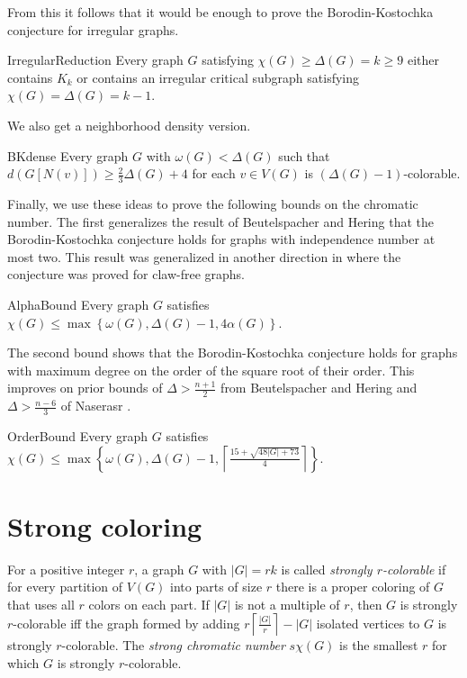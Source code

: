 \documentclass[12pt]{article}
\theoremstyle{plain}
\theoremstyle{definition}
\theoremstyle{remark}
\newcommand{\set}[1]{\left\{ #1 \right\}}
\newcommand{\card}[1]{\left|#1\right|}
\newcommand{\ceil}[1]{\left\lceil#1\right\rceil}
\begin{document}
From this it follows that it would be enough to prove the Borodin-Kostochka conjecture for irregular graphs.

\begin{repthm}{IrregularReduction}
Every graph $G$ satisfying $\chi(G) \geq \Delta(G) = k \geq 9$ either
contains $K_k$ or contains an irregular critical subgraph satisfying $\chi(G)
= \Delta(G) = k - 1$.
\end{repthm}

We also get a neighborhood density version.

\begin{repthm}{BKdense}
Every graph $G$ with $\omega(G) < \Delta(G)$ such that $d(G[N(v)]) \geq \frac23\Delta(G) + 4$ for each $v \in V(G)$ is $(\Delta(G)-1)$-colorable.
\end{repthm}

Finally, we use these ideas to prove the following bounds on the chromatic number.  The first generalizes the result of Beutelspacher and Hering \cite{beutelspacher1984minimal} that the Borodin-Kostochka conjecture holds for graphs with independence number at most two.  This result was generalized in another direction in \cite{cranstonrabernclaw} where the conjecture was proved for claw-free graphs.

\begin{repthm}{AlphaBound}
Every graph $G$ satisfies $\chi(G) \leq \max\set{\omega(G), \Delta(G) - 1, 4\alpha(G)}$.
\end{repthm}

The second bound shows that the Borodin-Kostochka conjecture holds for graphs with maximum degree on the order of the square root of their order.  This improves on prior bounds of $\Delta > \frac{n + 1}{2}$ from Beutelspacher and Hering \cite{beutelspacher1984minimal} and $\Delta > \frac{n-6}{3}$ of Naserasr \cite{naserasr}.

\begin{repthm}{OrderBound}
Every graph $G$ satisfies $\chi(G) \leq \max\set{\omega(G), \Delta(G) - 1, \ceil{\frac{15 + \sqrt{48|G| + 73}}{4}}}$.
\end{repthm}

\section{Strong coloring}
For a positive integer $r$, a graph $G$ with $\card{G} = rk$ is called \emph{strongly $r$-colorable} if for every partition of $V(G)$ into parts of size $r$ there is a proper coloring of $G$ that uses all $r$ colors on each part.  If $\card{G}$ is not a multiple of $r$, then $G$ is strongly $r$-colorable iff the graph formed by adding $r\ceil{\frac{|G|}{r}} - |G|$ isolated vertices to $G$ is strongly $r$-colorable.  The \emph{strong chromatic number} $s\chi(G)$ is the smallest $r$ for which $G$ is strongly $r$-colorable.
\end{document}
